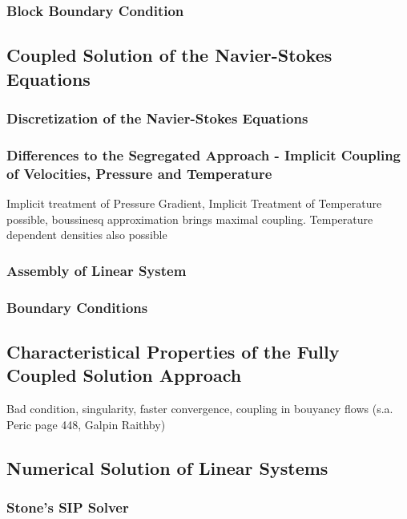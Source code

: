 \documentclass[article,type=msc,colorback,accentcolor=tud2a]{tudthesis}
\begin{document}
      \subsubsection{Block Boundary Condition}
      
    \subsection{Coupled Solution of the Navier-Stokes Equations}

      \subsubsection{Discretization of the Navier-Stokes Equations}
      \subsubsection{Differences to the Segregated Approach - Implicit Coupling of Velocities, Pressure and Temperature}

          Implicit treatment of Pressure Gradient, Implicit Treatment of Temperature possible, boussinesq approximation brings maximal coupling. Temperature dependent densities also possible

      \subsubsection{Assembly of Linear System}

      \subsubsection{Boundary Conditions}

      \subsection{Characteristical Properties of the Fully Coupled Solution Approach}

        Bad condition, singularity, faster convergence, coupling in bouyancy flows (s.a. Peric page 448, Galpin Raithby)

      \subsection{Numerical Solution of Linear Systems}

        \subsubsection{Stone's SIP Solver}
\end{document}
